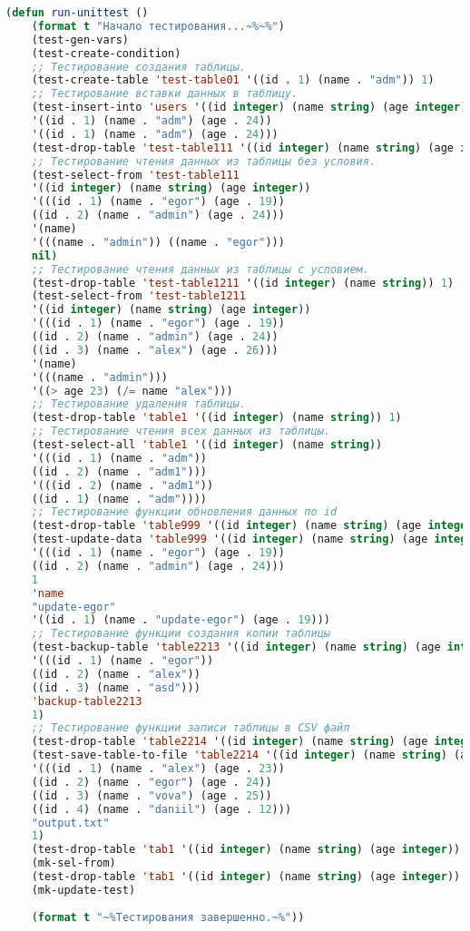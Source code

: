\begin{lstlisting}[language=Lisp]
	(defun run-unittest ()
	(format t "Начало тестирования...~%~%")
	(test-gen-vars)
	(test-create-condition)
	;; Тестирование создания таблицы.
	(test-create-table 'test-table01 '((id . 1) (name . "adm")) 1)
	;; Тестирование вставки данных в таблицу.
	(test-insert-into 'users '((id integer) (name string) (age integer))
	'((id . 1) (name . "adm") (age . 24))
	'((id . 1) (name . "adm") (age . 24)))
	(test-drop-table 'test-table111 '((id integer) (name string) (age integer)) 1)
	;; Тестирование чтения данных из таблицы без условия.
	(test-select-from 'test-table111
	'((id integer) (name string) (age integer))
	'(((id . 1) (name . "egor") (age . 19))
	((id . 2) (name . "admin") (age . 24)))
	'(name)
	'(((name . "admin")) ((name . "egor")))
	nil)
	;; Тестирование чтения данных из таблицы с условием.
	(test-drop-table 'test-table1211 '((id integer) (name string)) 1)
	(test-select-from 'test-table1211
	'((id integer) (name string) (age integer))
	'(((id . 1) (name . "egor") (age . 19))
	((id . 2) (name . "admin") (age . 24))
	((id . 3) (name . "alex") (age . 26)))
	'(name)
	'(((name . "admin")))
	'((> age 23) (/= name "alex")))
	;; Тестирование удаления таблицы.
	(test-drop-table 'table1 '((id integer) (name string)) 1)
	;; Тестирование чтения всех данных из таблицы.
	(test-select-all 'table1 '((id integer) (name string))
	'(((id . 1) (name . "adm"))
	((id . 2) (name . "adm1")))
	'(((id . 2) (name . "adm1"))
	((id . 1) (name . "adm"))))
	;; Тестирование функции обновления данных по id
	(test-drop-table 'table999 '((id integer) (name string) (age integer)) 1)
	(test-update-data 'table999 '((id integer) (name string) (age integer))
	'(((id . 1) (name . "egor") (age . 19))
	((id . 2) (name . "admin") (age . 24)))
	1
	'name
	"update-egor"
	'((id . 1) (name . "update-egor") (age . 19)))
	;; Тестирование функции создания копии таблицы
	(test-backup-table 'table2213 '((id integer) (name string) (age integer))
	'(((id . 1) (name . "egor"))
	((id . 2) (name . "alex"))
	((id . 3) (name . "asd")))
	'backup-table2213
	1)
	;; Тестирование функции записи таблицы в CSV файл
	(test-drop-table 'table2214 '((id integer) (name string) (age integer)) 1)
	(test-save-table-to-file 'table2214 '((id integer) (name string) (age integer))
	'(((id . 1) (name . "alex") (age . 23))
	((id . 2) (name . "egor") (age . 24))
	((id . 3) (name . "vova") (age . 25))
	((id . 4) (name . "daniil") (age . 12)))
	"output.txt"
	1)
	(test-drop-table 'tab1 '((id integer) (name string) (age integer)) 1)
	(mk-sel-from)
	(test-drop-table 'tab1 '((id integer) (name string) (age integer)) 1)
	(mk-update-test)
	
	(format t "~%Тестирования завершенно.~%"))
\end{lstlisting}  

\fi
